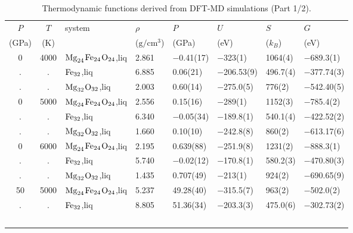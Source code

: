 \begin{table}[hp]
\centering

\caption{Thermodynamic functions derived from DFT-MD simulations (Part 1/2).
\label{tab:results}}
\begin{adjustbox}{max width=\textwidth}
\begin{tabular}{ccllllll}
    \hline
 {$P$} & {$T$} & {system} &  {$\rho$} & 
 {$P$} & {$U$} & {$S$} &  {$G$}  \\
 {(GPa)} & {(K)} & &  {($\mathrm{g}/\mathrm{cm}^3$)} 
   & {(GPa)} & {(eV)} & {($k_B$)} & {(eV)} \\
   \hline
             0 &   4000 &  $\rm{Mg}_{24}$$\rm{Fe}_{24}$$\rm{O}_{24}$,liq &   2.861 &   $-$0.41(17) &     $-$323(1) &    1064(4) &     $-$689.3(1) \\
             . &      . &                             $\rm{Fe}_{32}$,liq &   6.885 &    0.06(21) &  $-$206.53(9) &   496.7(4) &    $-$377.74(3) \\
             . &      . &                $\rm{Mg}_{32}$$\rm{O}_{32}$,liq &   2.003 &    0.60(14) &   $-$275.0(5) &     776(2) &    $-$542.40(5) \\
             0 &   5000 &  $\rm{Mg}_{24}$$\rm{Fe}_{24}$$\rm{O}_{24}$,liq &   2.556 &    0.15(16) &     $-$289(1) &    1152(3) &     $-$785.4(2) \\
             . &      . &                             $\rm{Fe}_{32}$,liq &   6.340 &   $-$0.05(34) &   $-$189.8(1) &   540.1(4) &    $-$422.52(2) \\
             . &      . &                $\rm{Mg}_{32}$$\rm{O}_{32}$,liq &   1.660 &    0.10(10) &   $-$242.8(8) &     860(2) &    $-$613.17(6) \\
             0 &   6000 &  $\rm{Mg}_{24}$$\rm{Fe}_{24}$$\rm{O}_{24}$,liq &   2.195 &   0.639(88) &   $-$251.9(8) &    1231(2) &     $-$888.3(1) \\
             . &      . &                             $\rm{Fe}_{32}$,liq &   5.740 &   $-$0.02(12) &   $-$170.8(1) &   580.2(3) &    $-$470.80(3) \\
             . &      . &                $\rm{Mg}_{32}$$\rm{O}_{32}$,liq &   1.435 &   0.707(49) &     $-$213(1) &     924(2) &    $-$690.65(9) \\
            50 &   5000 &  $\rm{Mg}_{24}$$\rm{Fe}_{24}$$\rm{O}_{24}$,liq &   5.237 &   49.28(40) &   $-$315.5(7) &     963(2) &     $-$502.0(2) \\
             . &      . &                             $\rm{Fe}_{32}$,liq &   8.805 &   51.36(34) &   $-$203.3(3) &   475.0(6) &    $-$302.73(2) \\
$$
\end{tabular}
\end{adjustbox}
\end{table}

